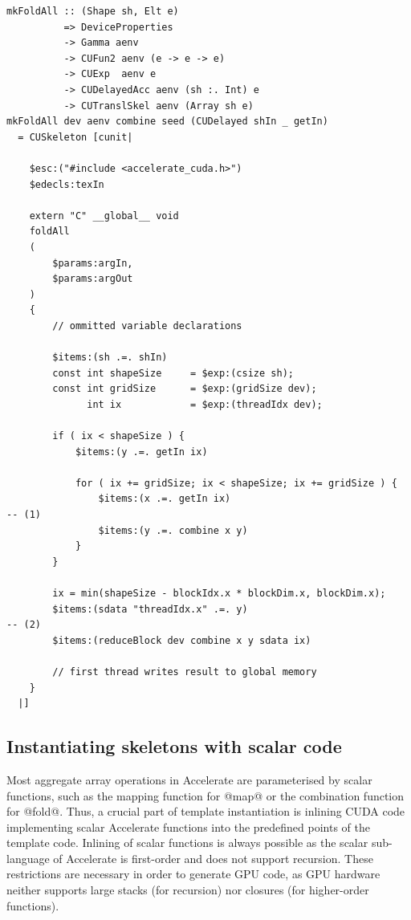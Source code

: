 \begin{lstlisting}[style=haskell_float
    ,label=lst:mkfold
    ,caption={Accelerate CUDA skeleton for the \code{foldAll} operation}]
mkFoldAll :: (Shape sh, Elt e)
          => DeviceProperties
          -> Gamma aenv
          -> CUFun2 aenv (e -> e -> e)
          -> CUExp  aenv e
          -> CUDelayedAcc aenv (sh :. Int) e
          -> CUTranslSkel aenv (Array sh e)
mkFoldAll dev aenv combine seed (CUDelayed shIn _ getIn)
  = CUSkeleton [cunit|

    $esc:("#include <accelerate_cuda.h>")
    $edecls:texIn

    extern "C" __global__ void
    foldAll
    (
        $params:argIn,
        $params:argOut
    )
    {
        // ommitted variable declarations

        $items:(sh .=. shIn)
        const int shapeSize     = $exp:(csize sh);
        const int gridSize      = $exp:(gridSize dev);
              int ix            = $exp:(threadIdx dev);

        if ( ix < shapeSize ) {
            $items:(y .=. getIn ix)

            for ( ix += gridSize; ix < shapeSize; ix += gridSize ) {
                $items:(x .=. getIn ix)                                                -- (1)
                $items:(y .=. combine x y)
            }
        }

        ix = min(shapeSize - blockIdx.x * blockDim.x, blockDim.x);
        $items:(sdata "threadIdx.x" .=. y)                                             -- (2)
        $items:(reduceBlock dev combine x y sdata ix)

        // first thread writes result to global memory
    }
  |]
\end{lstlisting}


\subsection{Instantiating skeletons with scalar code}
\label{sec:instantiating_skeletons_with_scalar_code}

Most aggregate array operations in Accelerate are parameterised by scalar
functions, such as the mapping function for @map@ or the combination
function for @fold@. Thus, a crucial part of template instantiation is
inlining CUDA code implementing scalar Accelerate functions into the predefined
points of the template code. Inlining of scalar functions is always possible as
the scalar sub-language of Accelerate is first-order and does not support
recursion. These restrictions are necessary in order to generate GPU code, as
GPU hardware neither supports large stacks (for recursion) nor closures (for
higher-order functions).


